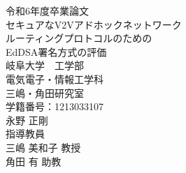 \documentclass[
  luatex,
  paper=a4paper,
  fontsize=11pt,
  report,
  jlreq_notes,
]{jlreq}
\begin{document}





\begin{titlepage}
  \centering
  {\large 令和6年度卒業論文}\\
  \vspace{2em}
  {\LARGE セキュアなV2Vアドホックネットワーク\\
  ルーティングプロトコルのための\\[0.5em]
  EdDSA署名方式の評価}\\
  \vspace{4em}
  {\large 岐阜大学　工学部}\\
  {\large 電気電子・情報工学科}\\
  \vspace{2em}
  {\large 三嶋・角田研究室}\\
  \vspace{2em}
  {\large 学籍番号：1213033107}\\
  \vspace{2em}
  {\Large 永野 正剛}\\
  \vspace{3em}
  {\large 指導教員}\\
  \vspace{1em}
  {\large 三嶋 美和子 教授}\\
  \vspace{1em}
  {\large 角田 有 助教}\\
  \vfill

\end{titlepage}
\end{document}

